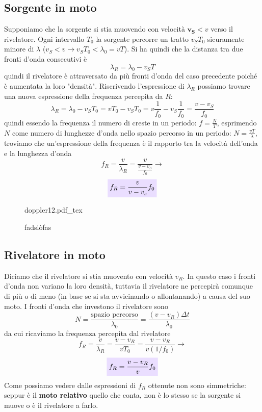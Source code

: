 \documentclass[x11names]{report}
\newcommand{\incfig}[1]{%
	\def\svgwidth{\columnwidth}
	{#1.pdf_tex}
}
\newcommand{\viola}[1]{\colorbox{yred}{$\displaystyle #1$}}
\begin{document}
	\subsection{Sorgente in moto}
	Supponiamo che la sorgente si stia muovendo con velocità \(\boldsymbol{v_S} < v\) verso il rivelatore. Ogni intervallo \(T_0\) la sorgente percorre un tratto \(v_ST_0\) sicuramente minore di \(\lambda\) (\(v_S < v \to v_ST_0 < \lambda_0= vT\)). Si ha quindi che la distanza tra due fronti d'onda consecutivi è
	\[ 
	\lambda_R = \lambda_0 - v_ST
	\]
	quindi il rivelatore è attraversato da più fronti d'onda del caso precedente poiché è aumentata la loro "densità". Riscrivendo l'espressione di \(\lambda_R\) possiamo trovare una nuova espressione della frequenza percepita da \(R\): 
	\[ 
	\lambda_R = \lambda_0 - v_ST_0 = vT_0 - v_ST_0 = v\frac{1}{f_0} - v_S\frac{1}{f_0} = \frac{v - v_S}{f_0}
	\]
	quindi essendo la frequenza il numero di creste in un periodo: \(f =\frac{N}{T}\), esprimendo \(N\) come numero di lunghezze d'onda nello spazio percorso in un periodo: \(N = \frac{vT}{\lambda}\), troviamo che un'espressione della frequenza è il rapporto tra la velocità dell'onda e la lunghezza d'onda 
	\[ 
	f_R = \frac{v}{\lambda_R} = \frac{v}{\frac{v - v_S}{f_0}} \to
	\]
	\begin{equation}
		\viola{f_R = \frac{v}{v - v_s}f_0}
	\end{equation}
	
	\begin{figure}[ht]
		\centering
		\incfig{doppler12}
		\caption{fadslòfas}
		\label{fig:fasdkllfas}
	\end{figure}
	
	\subsection{Rivelatore in moto}
	Diciamo che il rivelatore si stia muovento con velocità \(v_R\). In questo caso i fronti d'onda non variano la loro densità, tuttavia il rivelatore ne percepirà comunque di più o di meno (in base se si sta avvicinando o allontanando) a causa del suo moto. I fronti d'onda che investono il rivelatore sono
	\[ 
	N = \frac{\text{spazio percorso}}{\lambda_0} = \frac{(v - v_R)\Delta t}{\lambda_0}
	\]
	da cui ricaviamo la frequenza percepita dal rivelatore
	\[ 
	f_R = \frac{v}{\lambda_R} = \frac{v - v_R}{vT_0} = \frac{v - v_R}{v(1/f_0)} \to
	\]
	\begin{equation}
		\viola{f_R = \frac{v - v_R}{v}f_0}
	\end{equation}
	Come possiamo vedere dalle espressioni di \(f_R\) ottenute non sono simmetriche: seppur è il \textbf{moto relativo} quello che conta, non è lo stesso se la sorgente si muove o è il rivelatore a farlo.
	
\end{document}
